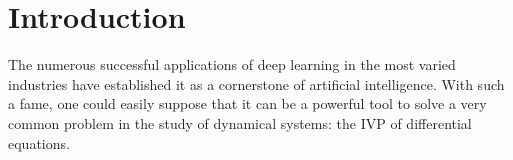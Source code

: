 \chapter{Introduction}\label{ch:intro}

\glsresetall







The numerous successful applications of deep learning in the most varied industries \cite{ciregan_multi-column_2012,krizhevsky_imagenet_2012,silver_mastering_2016} have established it as a cornerstone of artificial intelligence.
With such a fame, one could easily suppose that it can be a powerful tool to solve a very common problem in the study of dynamical systems: the \gls{IVP} of differential equations.

